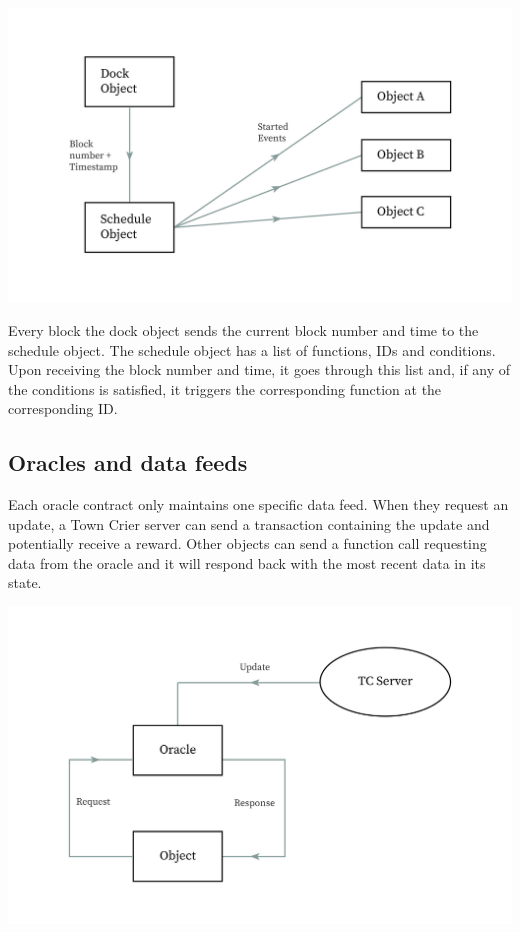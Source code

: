 \documentclass[conference]{IEEEtran}
\begin{document}
\includegraphics[width=\linewidth]{images/scheduling.jpg}

Every block the dock object sends the current block number and time to the schedule object. The schedule object has a list of functions, IDs and conditions. Upon receiving the block number and time, it goes through this list and, if any of the conditions is satisfied, it triggers the corresponding function at the corresponding ID.

\subsection{Oracles and data feeds}
Each oracle contract only maintains one specific data feed. When they request an update, a Town Crier server can send a transaction containing the update and potentially receive a reward. Other objects can send a function call requesting data from the oracle and it will respond back with the most recent data in its state.

\includegraphics[width=\linewidth]{images/oracle.jpg}
\end{document}
